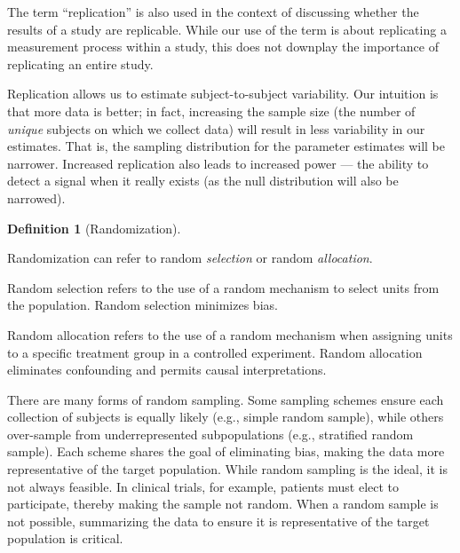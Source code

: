 \documentclass[
  letterpaper,
  DIV=11,
  numbers=noendperiod]{scrreprt}
\theoremstyle{definition}
\newtheorem{definition}{Definition}[chapter]
\theoremstyle{definition}
\theoremstyle{remark}
\begin{document}
\begin{tcolorbox}[enhanced jigsaw, left=2mm, toprule=.15mm, arc=.35mm, breakable, opacitybacktitle=0.6, opacityback=0, rightrule=.15mm, colbacktitle=quarto-callout-warning-color!10!white, coltitle=black, leftrule=.75mm, toptitle=1mm, colframe=quarto-callout-warning-color-frame, titlerule=0mm, title=\textcolor{quarto-callout-warning-color}{\faExclamationTriangle}\hspace{0.5em}{Warning}, bottomrule=.15mm, colback=white, bottomtitle=1mm]

The term ``replication'' is also used in the context of discussing
whether the results of a study are replicable. While our use of the term
is about replicating a measurement process within a study, this does not
downplay the importance of replicating an entire study.

\end{tcolorbox}

Replication allows us to estimate subject-to-subject variability. Our
intuition is that more data is better; in fact, increasing the sample
size (the number of \emph{unique} subjects on which we collect data)
will result in less variability in our estimates. That is, the sampling
distribution for the parameter estimates will be narrower. Increased
replication also leads to increased power --- the ability to detect a
signal when it really exists (as the null distribution will also be
narrowed).

\begin{definition}[Randomization]\protect\hypertarget{def-randomization}{}\label{def-randomization}

Randomization can refer to random \emph{selection} or random
\emph{allocation}.

Random selection refers to the use of a random mechanism to select units
from the population. Random selection minimizes bias.

Random allocation refers to the use of a random mechanism when assigning
units to a specific treatment group in a controlled experiment. Random
allocation eliminates confounding and permits causal interpretations.

\end{definition}

There are many forms of random sampling. Some sampling schemes ensure
each collection of subjects is equally likely (e.g., simple random
sample), while others over-sample from underrepresented subpopulations
(e.g., stratified random sample). Each scheme shares the goal of
eliminating bias, making the data more representative of the target
population. While random sampling is the ideal, it is not always
feasible. In clinical trials, for example, patients must elect to
participate, thereby making the sample not random. When a random sample
is not possible, summarizing the data to ensure it is representative of
the target population is critical.
\end{document}
